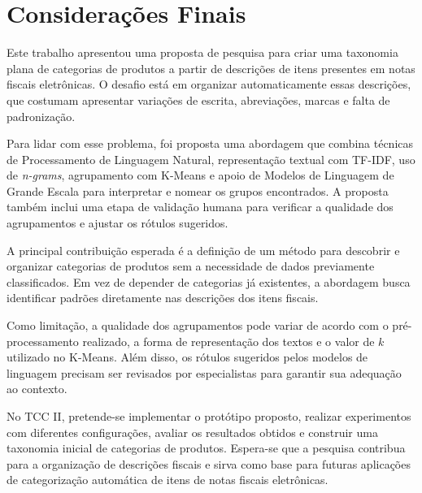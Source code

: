 \documentclass[english,brazilian]{UNISINOSmonografia}
\begin{document}
\chapter{Considerações Finais}

Este trabalho apresentou uma proposta de pesquisa para criar uma taxonomia plana de categorias de produtos a partir de descrições de itens presentes em notas fiscais eletrônicas. O desafio está em organizar automaticamente essas descrições, que costumam apresentar variações de escrita, abreviações, marcas e falta de padronização.

Para lidar com esse problema, foi proposta uma abordagem que combina técnicas de Processamento de Linguagem Natural, representação textual com TF-IDF, uso de \textit{n-grams}, agrupamento com K-Means e apoio de Modelos de Linguagem de Grande Escala para interpretar e nomear os grupos encontrados. A proposta também inclui uma etapa de validação humana para verificar a qualidade dos agrupamentos e ajustar os rótulos sugeridos.

A principal contribuição esperada é a definição de um método para descobrir e organizar categorias de produtos sem a necessidade de dados previamente classificados. Em vez de depender de categorias já existentes, a abordagem busca identificar padrões diretamente nas descrições dos itens fiscais.

Como limitação, a qualidade dos agrupamentos pode variar de acordo com o pré-processamento realizado, a forma de representação dos textos e o valor de $k$ utilizado no K-Means. Além disso, os rótulos sugeridos pelos modelos de linguagem precisam ser revisados por especialistas para garantir sua adequação ao contexto.

No TCC II, pretende-se implementar o protótipo proposto, realizar experimentos com diferentes configurações, avaliar os resultados obtidos e construir uma taxonomia inicial de categorias de produtos. Espera-se que a pesquisa contribua para a organização de descrições fiscais e sirva como base para futuras aplicações de categorização automática de itens de notas fiscais eletrônicas.













\end{document}

